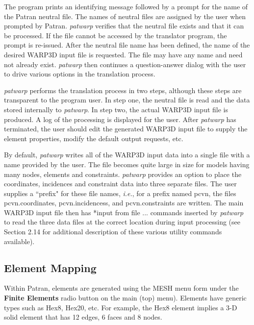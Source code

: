 \documentclass[11pt]{report}
\numberwithin{equation}{section}
\newcommand{\patwarp}{\textit{patwarp }}
\begin{document}
The program prints an identifying message
followed by a prompt for the name of the Patran neutral file. The names of
neutral files are assigned by the user when prompted by Patran. \patwarp verifies
that the neutral file exists and that it can be processed. If the file cannot be
accessed by the translator program, the prompt is re-issued. After the neutral
file name has been defined, the name of the desired WARP3D input file is
requested. The file may have any name and need not already exist. \patwarp then
continues a question-answer dialog with the user to drive various options in the
translation process.

\patwarp performs the translation process in two steps, although these steps are
transparent to the program user. In step one, the neutral file is read and the
data stored internally to \textit{patwarp}. In step two, the actual WARP3D input file is
produced. A log of the processing is displayed for the user. After
\textit{patwarp} has terminated, the user should edit the generated WARP3D input file to
supply the element properties, modify the default output requests, etc.

By default, \textit{patwarp} writes all of the WARP3D input data into a single file with a name
provided by the user. The file becomes quite large in size for models having
many nodes, elements and constraints. \patwarp provides an option to place the
coordinates, incidences and constraint data into three separate files. The user
supplies a ``prefix" for these file names, \textit{i.e.}, for a prefix named pcvn, the
files pcvn.coordinates, pcvn.incidencess, and pcvn.constraints are written. The
main WARP3D input file then has *input from file ... commands inserted by
\textit{patwarp} to read the three data files at the correct location during input
processing (see Section 2.14 for additional description of these various utility
commands available).

\subsection{Element Mapping}
\noindent
Within Patran, elements are generated using the MESH menu form under the \textbf{Finite
Elements} radio button on the main (top) menu). Elements have generic types such
as Hex8, Hex20, etc. For example, the Hex8 element implies a 3-D solid element
that has 12 edges, 6 faces and 8 nodes. 
\end{document}
